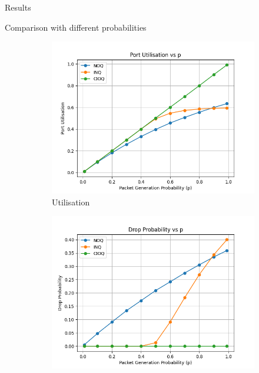 \begin{section}{Results}

    \begin{subsection}{Comparison with different probabilities}

    \begin{figure}[h!]
        \centering
        \begin{subfigure}[b]{0.45\textwidth}
            \centering
            \includegraphics[width=\textwidth]{figures/fig1/fig1a.png}
            \caption{Utilisation}
            \label{fig:utilisation}
        \end{subfigure}
        \hfill
        \begin{subfigure}[b]{0.45\textwidth}
            \centering
            \includegraphics[width=\textwidth]{figures/fig1/fig1b.png}

\end{subfigure}
\end{figure}
\end{subsection}
\end{section}
